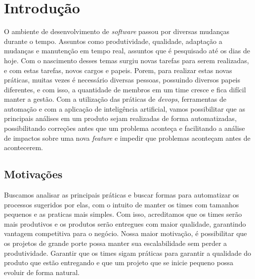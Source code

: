 \chapter{Introdução}
O ambiente de desenvolvimento de \textit{software} passou por diversas mudanças
durante o tempo. Assuntos como produtividade, qualidade, adaptação a mudanças e
manutenção em tempo real, assuntos que é pesquisado até os dias de hoje. \newline
Com o nascimento desses temas surgiu novas tarefas para serem realizadas, e
com estas tarefas, novos cargos e papeis. Porem, para realizar estas novas
práticas, muitas vezes é necessário diversas pessoas, possuindo diversos papeis
diferentes, e com isso, a quantidade de membros em um time cresce e fica difícil
manter a gestão.  \newline
Com a utilização das práticas de \textit{devops}, ferramentas de automação e com
a aplicação de inteligência artificial, vamos possibilitar que as principais
análises em um produto sejam realizadas de forma automatizadas, possibilitando
correções antes que um problema aconteça e facilitando a análise de impactos sobre
uma nova \textit{feature} e impedir que problemas aconteçam antes de acontecerem. \newline

\section{Motivações}
Buscamos analisar as principais práticas e buscar formas para automatizar
os processos sugeridos por elas, com o intuito de manter os times com tamanhos
pequenos e as praticas mais simples. Com isso, acreditamos que os times serão
mais produtivos e os produtos serão entregues com maior qualidade, garantindo
vantagem competitiva para o negócio. \newline
Nossa maior motivação, é possibilitar que os projetos de grande porte possa
manter sua escalabilidade sem perder a produtividade. Garantir que os times
sigam práticas para garantir a qualidade do produto que estão entregando e que
um projeto que se inicie pequeno possa evoluir de forma natural. 
